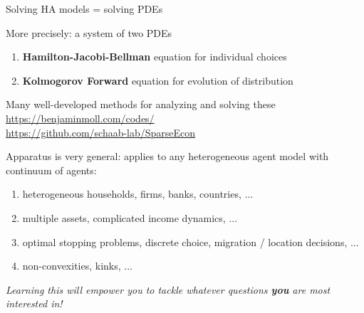 \documentclass[11pt, aspectratio=169]{beamer}
\newenvironment{witemize}{\itemize\addtolength{\itemsep}{10pt}}{\enditemize}
\begin{document}
\begin{frame}{Solving HA models = solving PDEs}

\vspace{2mm}
\begin{witemize}
\item More precisely: a system of two PDEs
\begin{enumerate}
	\item {\color{blue}\textbf{Hamilton-Jacobi-Bellman}} equation for individual choices
	\item {\color{blue}\textbf{Kolmogorov Forward}} equation for evolution of distribution
\end{enumerate}

\item Many well-developed methods for analyzing and solving these \\
{\footnotesize \url{https://benjaminmoll.com/codes/}}
\\
{\footnotesize \url{https://github.com/schaab-lab/SparseEcon}}

\pause
\item Apparatus is very general: applies to any heterogeneous agent model with continuum of agents:
\begin{enumerate}
	\item heterogeneous households, firms, banks, countries, ... 
	\item multiple assets, complicated income dynamics, ...
	\item optimal stopping problems, discrete choice, migration / location decisions, ... 
	\item non-convexities, kinks, ...
\end{enumerate}

\end{witemize}

\vspace{2mm}
\textit{Learning this will empower you to tackle whatever questions \textbf{you} are most interested in!}
\end{frame}
\end{document}
